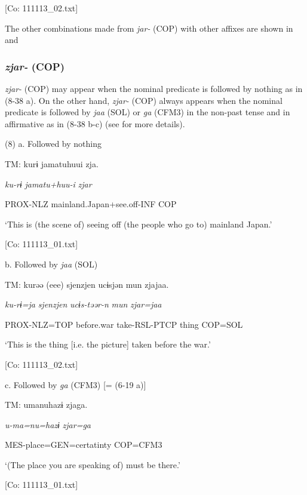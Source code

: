       [Co: 111113\_02.txt]

  The other combinations made from \textit{jar-} (COP) with other affixes are shown in  and 

\subsubsection{\textit{zjar-} (COP)}

\textit{zjar-} (COP) may appear when the nominal predicate is followed by nothing as in (8-38 a). On the other hand, \textit{zjar-} (COP) always appears when the nominal predicate is followed by \textit{jaa} (SOL) or \textit{ga} (CFM3) in the non-past tense and in affirmative as in (8-38 b-c) (see  for more details).

(8)  a. Followed by nothing

  TM:  kurɨ  jamatuhuui  zja.

    \textit{ku-rɨ}  \textit{jamatu+huu-i}  \textit{zjar}

    PROX-NLZ  mainland.Japan+see.off-INF  COP

    ‘This is (the scene of) seeing off (the people who go to) mainland Japan.’

    [Co: 111113\_01.txt]

  b. Followed by \textit{jaa} (SOL)

  TM:  kurəə  (eee)  sjenzjen  ucɨsjən  mun  zjajaa.

    \textit{ku-rɨ=ja}    \textit{sjenzjen}  \textit{ucɨs-təər-n}  \textit{mun}  \textit{zjar=jaa}

    PROX-NLZ=TOP    before.war  take-RSL-PTCP  thing  COP=SOL

    ‘This is the thing [i.e. the picture] taken before the war.’

    [Co: 111113\_02.txt]

  c. Followed by \textit{ga} (CFM3) [= (6-19 a)]

  TM:  umanuhazɨ  zjaga.

    \textit{u-ma=nu=hazɨ}  \textit{zjar=ga}

    MES-place=GEN=certatinty  COP=CFM3

    ‘(The place you are speaking of) must be there.’

    [Co: 111113\_01.txt]

